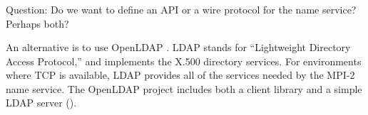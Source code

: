 \documentclass{article}
\begin{document}
%

\subsubsection{}
Question:  Do we want to define an API or a wire protocol for the name
service?  Perhaps both?

An alternative is to use OpenLDAP \cite{openldap}.  LDAP stands for
``Lightweight Directory Access Protocol,'' and implements the X.500
directory services.  For environments where TCP is available, LDAP
provides all of the services needed by the MPI-2 name service.  The
OpenLDAP project includes both a client library and a simple LDAP
server ().  
\end{document}
